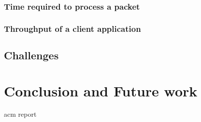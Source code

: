 \documentclass[a4paper,11pt]{report}
\begin{document}
\subsection{Time required to process a packet}
\subsection{Throughput of a client application}
\section{Challenges}

\chapter{Conclusion and Future work}

\newpage
 {acm}
 {report}
\end{document}
